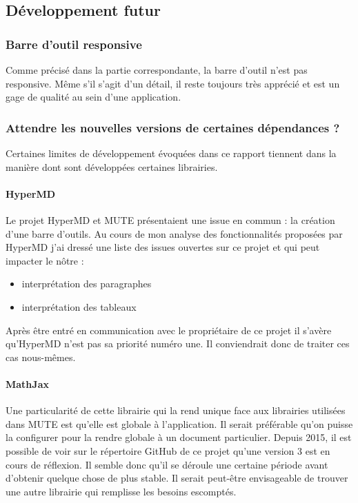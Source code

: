 \documentclass[12pt]{article}
\begin{document}
\subsection{Développement futur}
\subsubsection{Barre d'outil responsive}
Comme précisé dans la partie correspondante, la barre d'outil n'est pas responsive. Même s'il s'agit d'un détail, il reste toujours très apprécié et est un gage de qualité au sein d'une application.

\subsubsection{Attendre les nouvelles versions de certaines dépendances ?}
Certaines limites de développement évoquées dans ce rapport tiennent dans la manière dont sont développées certaines librairies.

\paragraph{HyperMD}
Le projet HyperMD et MUTE présentaient une issue en commun : la création d'une barre d'outils. Au cours de mon analyse des fonctionnalités proposées par HyperMD j'ai dressé une liste des issues ouvertes sur ce projet et qui peut impacter le nôtre :
\begin{itemize}
    \item interprétation des paragraphes
    \item interprétation des tableaux
\end{itemize}
Après être entré en communication avec le propriétaire de ce projet il s'avère qu'HyperMD n'est pas sa priorité numéro une. Il conviendrait donc de traiter ces cas nous-mêmes.

\paragraph{MathJax}
Une particularité de cette librairie qui la rend unique face aux librairies utilisées dans MUTE est qu'elle est globale à l'application. Il serait préférable qu'on puisse la configurer pour la rendre globale à un document particulier. Depuis 2015, il est possible de voir sur le répertoire GitHub de ce projet qu'une version 3 est en cours de réflexion. Il semble donc qu'il se déroule une certaine période avant d'obtenir quelque chose de plus stable. Il serait peut-être envisageable de trouver une autre librairie qui remplisse les besoins escomptés.
\end{document}
